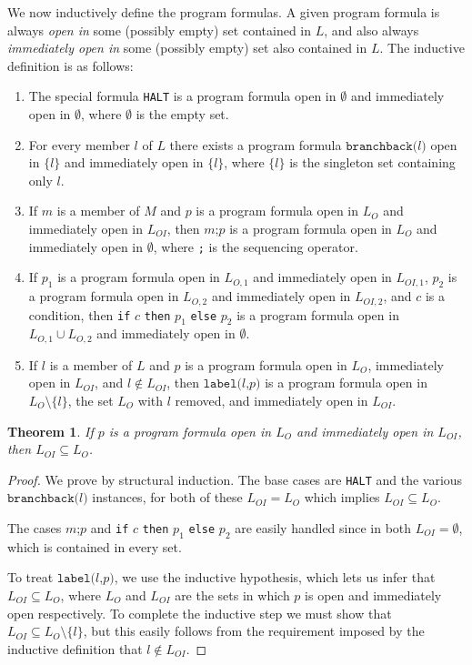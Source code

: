 \documentclass[11pt]{article}
\begin{document}
We now inductively define the program formulas.  A given program formula is always \emph{open in} some (possibly empty) set contained in $L$, and also always \emph{immediately open in} some (possibly empty) set also contained in $L$.  The inductive definition is as follows:

\begin{enumerate}
\item The special formula \texttt{HALT} is a program formula open in $\emptyset$ and immediately open in $\emptyset$, where $\emptyset$ is the empty set.
\item For every member $l$ of $L$ there exists a program formula $\texttt{branchback(}l\texttt{)}$ open in $\{l\}$ and immediately open in $\{l\}$, where $\{l\}$ is the singleton set containing only $l$.
\item If $m$ is a member of $M$ and $p$ is a program formula open in $L_{O}$ and immediately open in $L_{OI}$, then $m\texttt{;}p$ is a program formula open in $L_{O}$ and immediately open in $\emptyset$, where \texttt{;} is the sequencing operator.
\item If $p_{1}$ is a program formula open in $L_{O,1}$ and immediately open in $L_{OI,1}$, $p_{2}$ is a program formula open in $L_{O,2}$ and immediately open in $L_{OI,2}$, and $c$ is a condition, then \texttt{if} $c$ \texttt{then} $p_{1}$ \texttt{else} $p_{2}$ is a program formula open in $L_{O,1} \cup L_{O,2}$ and immediately open in $\emptyset$.
\item If $l$ is a member of $L$ and $p$ is a program formula open in $L_{O}$, immediately open in $L_{OI}$, and $l \notin L_{OI}$, then $\texttt{label(}l\texttt{,} p\texttt{)}$ is a program formula open in $L_{O} \setminus \{l\}$, the set $L_{O}$ with $l$ removed, and immediately open in $L_{OI}$.
\end{enumerate}

\newtheorem*{immedopencontainedinopen}{Theorem}
\begin{immedopencontainedinopen}
If $p$ is a program formula open in $L_{O}$ and immediately open in $L_{OI}$, then $L_{OI} \subseteq L_{O}$.
\end{immedopencontainedinopen}

\begin{proof}
We prove by structural induction.  The base cases are \texttt{HALT} and the various $\texttt{branchback(}l\texttt{)}$ instances, for both of these $L_{OI} = L_{O}$ which implies $L_{OI} \subseteq L_{O}$.

The cases $m\texttt{;}p$ and \texttt{if} $c$ \texttt{then} $p_{1}$ \texttt{else} $p_{2}$ are easily handled since in both $L_{OI} = \emptyset$, which is contained in every set.

To treat $\texttt{label(}l\texttt{,} p\texttt{)}$, we use the inductive hypothesis, which lets us infer that $L_{OI} \subseteq L_{O}$, where $L_{O}$ and $L_{OI}$ are the sets in which $p$ is open and immediately open respectively.  To complete the inductive step we must show that $L_{OI} \subseteq L_{O} \setminus \{l\}$, but this easily follows from the requirement imposed by the inductive definition that $l \notin L_{OI}$.
\end{proof}
\end{document}
